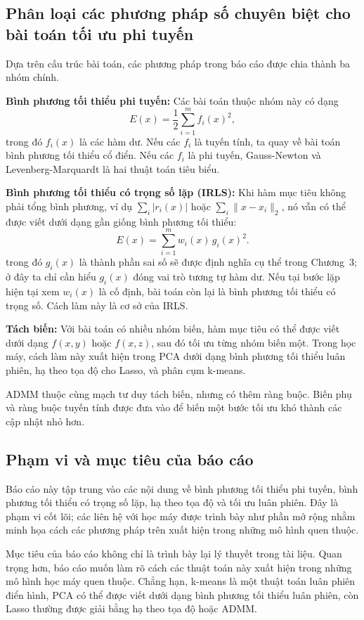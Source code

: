 \subsection{Phân loại các phương pháp số chuyên biệt cho bài toán tối ưu phi tuyến }
\label{SUB_SEC_phan_loai}
Dựa trên cấu trúc bài toán, các phương pháp trong báo cáo được chia thành ba nhóm chính.
\medskip

\textbf{Bình phương tối thiểu phi tuyến:} Các bài toán thuộc nhóm này có dạng
\begin{equation}
    E(x)=\frac{1}{2}\sum_{i=1}^{m} f_i(x)^2,
    \label{eq_intro_nls}
\end{equation}
trong đó $f_i(x)$ là các hàm dư. Nếu các $f_i$ là tuyến tính, ta quay về bài toán bình phương tối thiểu cổ điển. Nếu các $f_i$ là phi tuyến, Gauss-Newton và Levenberg-Marquardt là hai thuật toán tiêu biểu.
\medskip

\textbf{Bình phương tối thiểu có trọng số lặp (IRLS):} Khi hàm mục tiêu không phải tổng bình phương, ví dụ $\sum_i |r_i(x)|$ hoặc $\sum_i \|x-x_i\|_2$, nó vẫn có thể được viết dưới dạng gần giống bình phương tối thiểu:
\begin{equation}
    E(x)=\sum_{i=1}^{m} w_i(x)\,g_i(x)^2.
    \label{eq_intro_weighted_ls}
\end{equation}
trong đó $g_i(x)$ là thành phần sai số sẽ được định nghĩa cụ thể trong Chương~3; ở đây ta chỉ cần hiểu $g_i(x)$ đóng vai trò tương tự hàm dư.
Nếu tại bước lặp hiện tại xem $w_i(x)$ là cố định, bài toán còn lại là bình phương tối thiểu có trọng số. Cách làm này là cơ sở của IRLS.
\medskip

\textbf{Tách biến:} Với bài toán có nhiều nhóm biến, hàm mục tiêu có thể được viết dưới dạng $f(x,y)$ hoặc $f(x,z)$, sau đó tối ưu từng nhóm biến một. Trong học máy, cách làm này xuất hiện trong PCA dưới dạng bình phương tối thiểu luân phiên, hạ theo tọa độ cho Lasso, và phân cụm k-means.
\medskip

ADMM thuộc cùng mạch tư duy tách biến, nhưng có thêm ràng buộc. Biến phụ và ràng buộc tuyến tính được đưa vào để biến một bước tối ưu khó thành các cập nhật nhỏ hơn.

\subsection{Phạm vi và mục tiêu của báo cáo}
\label{SUB_SEC_pham_vi_muc_tieu}

Báo cáo này tập trung vào các nội dung về bình phương tối thiểu phi tuyến, bình phương tối thiểu có trọng số lặp, hạ theo tọa độ và tối ưu luân phiên.
Đây là phạm vi cốt lõi; các liên hệ với học máy được trình bày như phần mở rộng nhằm minh họa cách các phương pháp trên xuất hiện trong những mô hình quen thuộc.
\medskip

Mục tiêu của báo cáo không chỉ là trình bày lại lý thuyết trong tài liệu. Quan trọng hơn, báo cáo muốn làm rõ cách các thuật toán này xuất hiện trong những mô hình học máy quen thuộc. Chẳng hạn, k-means là một thuật toán luân phiên điển hình, PCA có thể được viết dưới dạng bình phương tối thiểu luân phiên, còn Lasso thường được giải bằng hạ theo tọa độ hoặc ADMM.

